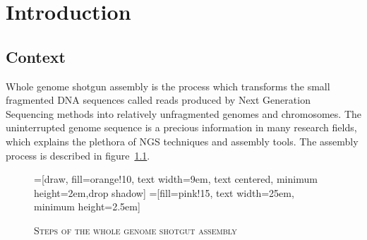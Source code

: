 \documentclass[12pt]{report}
\begin{document}
\chapter{Introduction}
\setcounter{page}{1}
\section{Context}
Whole genome shotgun assembly is the process which transforms the small fragmented DNA sequences called reads produced by Next Generation Sequencing methods into relatively unfragmented genomes and chromosomes. The uninterrupted genome sequence is a precious information in many research fields, which explains the plethora of NGS techniques and assembly tools. The assembly process is described in figure~\ref{fig:AssemblySteps}.
\begin{figure}[ht]
\caption{\textsc{Steps of the whole genome shotgut assembly}} \label{fig:AssemblySteps}
=[draw, fill=orange!10, text width=9em, 
    text centered, minimum height=2em,drop shadow]
=[fill=pink!15, text width=25em, minimum height=2.5em]
\end{figure}
\end{document}
